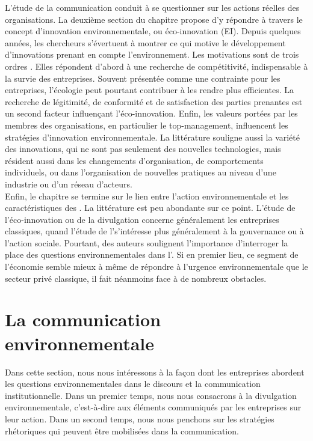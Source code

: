 L'étude de la communication conduit à se questionner sur les actions réelles des organisations. La deuxième section du chapitre propose d'y répondre à travers le concept d'innovation environnementale, ou éco-innovation (EI). Depuis quelques années, les chercheurs s'évertuent à montrer ce qui motive le développement d'innovations prenant en compte l'environnement. Les motivations sont de trois ordres \parencite{bansal2000why}. Elles répondent d'abord à une recherche de compétitivité, indispensable à la survie des entreprises. Souvent présentée comme une contrainte pour les entreprises, l'écologie peut pourtant contribuer à les rendre plus efficientes. La recherche de légitimité, de conformité et de satisfaction des parties prenantes est un second facteur influençant l'éco-innovation. Enfin, les valeurs portées par les membres des organisations, en particulier le top-management, influencent les stratégies d'innovation environnementale. La littérature souligne aussi la variété des innovations, qui ne sont pas seulement des nouvelles technologies, mais résident aussi dans les changements d'organisation, de comportements individuels, ou dans l'organisation de nouvelles pratiques au niveau d'une industrie ou d'un réseau d'acteurs. \\

Enfin, le chapitre se termine sur le lien entre l'action environnementale et les caractéristiques des \oess. La littérature est peu abondante sur ce point. L'étude de l'éco-innovation ou de la divulgation concerne généralement les entreprises classiques, quand l'étude de l'\ess s'intéresse plus généralement à la gouvernance ou à l'action sociale. Pourtant, des auteurs soulignent l'importance d'interroger la place des questions environnementales dans l'\ess \parencite{dart2010green, buchs2014role, edwards2013environmental}. Si en premier lieu, ce segment de l'économie semble mieux à même de répondre à l'urgence environnementale que le secteur privé classique, il fait néanmoins face à de nombreux obstacles.

\section{La communication environnementale}

    Dans cette section, nous nous intéressons à la façon dont les entreprises abordent les questions environnementales dans le discours et la communication institutionnelle. Dans un premier temps, nous nous consacrons à la divulgation environnementale, c'est-à-dire aux éléments communiqués par les entreprises sur leur action. Dans un second temps, nous nous penchons sur les stratégies rhétoriques qui peuvent être mobilisées dans la communication.

